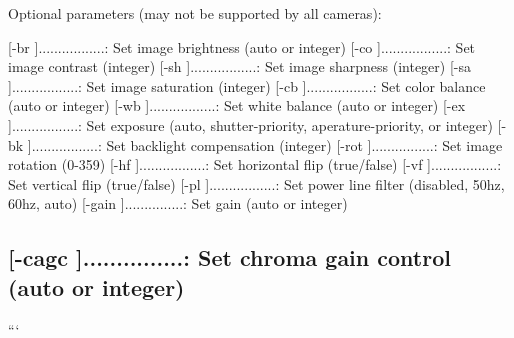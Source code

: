 Optional parameters (may not be supported by all cameras)\+:

\mbox{[}-\/br \mbox{]}.................\+: Set image brightness (auto or integer) \mbox{[}-\/co \mbox{]}.................\+: Set image contrast (integer) \mbox{[}-\/sh \mbox{]}.................\+: Set image sharpness (integer) \mbox{[}-\/sa \mbox{]}.................\+: Set image saturation (integer) \mbox{[}-\/cb \mbox{]}.................\+: Set color balance (auto or integer) \mbox{[}-\/wb \mbox{]}.................\+: Set white balance (auto or integer) \mbox{[}-\/ex \mbox{]}.................\+: Set exposure (auto, shutter-\/priority, aperature-\/priority, or integer) \mbox{[}-\/bk \mbox{]}.................\+: Set backlight compensation (integer) \mbox{[}-\/rot \mbox{]}................\+: Set image rotation (0-\/359) \mbox{[}-\/hf \mbox{]}.................\+: Set horizontal flip (true/false) \mbox{[}-\/vf \mbox{]}.................\+: Set vertical flip (true/false) \mbox{[}-\/pl \mbox{]}.................\+: Set power line filter (disabled, 50hz, 60hz, auto) \mbox{[}-\/gain \mbox{]}...............\+: Set gain (auto or integer) \subsection*{\mbox{[}-\/cagc \mbox{]}...............\+: Set chroma gain control (auto or integer) }

``` 